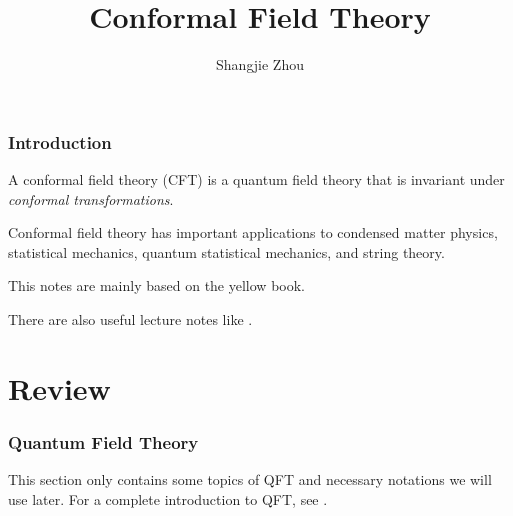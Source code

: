 \documentclass[10pt]{article}
\begin{document}
\title{Conformal Field Theory}
\author{Shangjie Zhou}
\maketitle
{}
\section*{Introduction}
A conformal field theory (CFT) is a quantum field theory that is invariant under \textit{conformal transformations}.

Conformal field theory has important applications to condensed matter physics, statistical mechanics, quantum statistical mechanics, and string theory.

This notes are mainly based on the yellow book\cite{DiFrancesco:1997nk}.

There are also useful lecture notes like \cite{Qualls:2015qjb,Tong:2009np}.

\clearpage
\part{Review}
\section{Quantum Field Theory}
This section only contains some topics of QFT and necessary notations we will use later.
For a complete introduction to QFT, see \cite{Peskin:1995ev,srednicki_2007,weinberg_1995,schwartz_2013,Zee:2003mt,Coleman:2018mew}.
\end{document}
